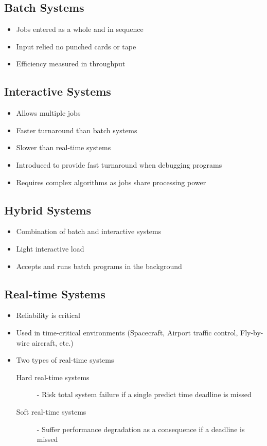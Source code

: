 \documentclass[12pt letter]{report}
\begin{document}
\subsection{Batch Systems}
\begin{itemize}
  \item Jobs entered as a whole and in sequence
  \item Input relied no punched cards or tape
  \item  Efficiency measured in throughput
\end{itemize}

\subsection{Interactive Systems}
\begin{itemize}
  \item Allows multiple jobs
  \item Faster turnaround than batch systems
  \item Slower than real-time systems
  \item Introduced to provide fast turnaround when debugging programs
  \item Requires complex algorithms as jobs share processing power
\end{itemize}

\subsection{Hybrid Systems}
\begin{itemize}
  \item Combination of batch and interactive systems
  \item Light interactive load
  \item Accepts and runs batch programs in the background
\end{itemize}

\subsection{Real-time Systems}
\begin{itemize}
  \item Reliability is critical
  \item Used in time-critical environments (Spacecraft, Airport traffic control, Fly-by-wire aircraft, etc.)
  \item Two types of real-time systems
        \begin{description}
          \item[Hard real-time systems] - Risk total system failure if a single predict time deadline is missed
          \item[Soft real-time systems] - Suffer performance degradation as a consequence if a deadline is missed
        \end{description}
\end{itemize}
\end{document}

